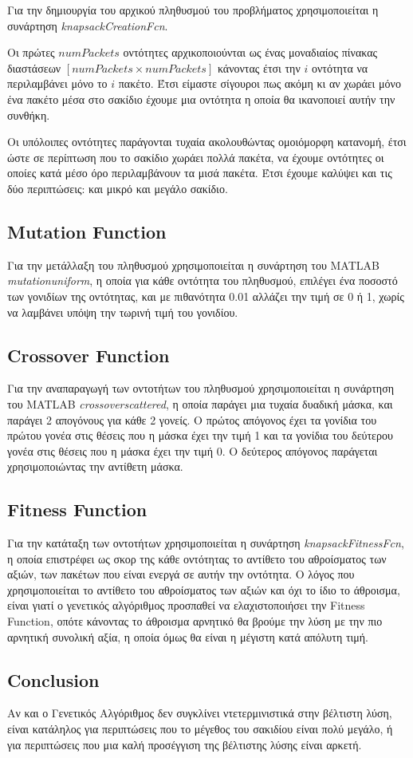 \documentclass{article}
\begin{document}
Για την δημιουργία του αρχικού πληθυσμού του προβλήματος χρησιμοποιείται η
συνάρτηση \textit{knapsackCreationFcn}.

Οι πρώτες $\textit{numPackets}$ οντότητες αρχικοποιούνται ως ένας μοναδιαίος
πίνακας διαστάσεων $\left[\textit{numPackets} \times \textit{numPackets}\right]$
κάνοντας έτσι την $i$ οντότητα να περιλαμβάνει μόνο το $i$ πακέτο. Έτσι είμαστε
σίγουροι πως ακόμη κι αν χωράει μόνο ένα πακέτο μέσα στο σακίδιο έχουμε μια
οντότητα η οποία θα ικανοποιεί αυτήν την συνθήκη.

Οι υπόλοιπες οντότητες παράγονται τυχαία ακολουθώντας ομοιόμορφη κατανομή, έτσι
ώστε σε περίπτωση που το σακίδιο χωράει πολλά πακέτα, να έχουμε οντότητες οι
οποίες κατά μέσο όρο περιλαμβάνουν τα μισά πακέτα. Έτσι έχουμε καλύψει και τις
δύο περιπτώσεις: και μικρό και μεγάλο σακίδιο.

\subsection{Mutation Function}

\begin{sloppypar}
Για την μετάλλαξη του πληθυσμού χρησιμοποιείται η συνάρτηση του MATLAB
\textit{mutationuniform}, η οποία για κάθε οντότητα του πληθυσμού, επιλέγει ένα
ποσοστό των γονιδίων της οντότητας, και με πιθανότητα 0.01 αλλάζει την τιμή σε 0
ή 1, χωρίς να λαμβάνει υπόψη την τωρινή τιμή του γονιδίου.
\end{sloppypar}

\subsection{Crossover Function}

Για την αναπαραγωγή των οντοτήτων του πληθυσμού χρησιμοποιείται η συνάρτηση του
MATLAB \textit{crossoverscattered}, η οποία παράγει μια τυχαία δυαδική μάσκα,
και παράγει 2 απογόνους για κάθε 2 γονείς. Ο πρώτος απόγονος έχει τα γονίδια του
πρώτου γονέα στις θέσεις που η μάσκα έχει την τιμή 1 και τα γονίδια του δεύτερου
γονέα στις θέσεις που η μάσκα έχει την τιμή 0. Ο δεύτερος απόγονος παράγεται
χρησιμοποιώντας την αντίθετη μάσκα.

\subsection{Fitness Function}

Για την κατάταξη των οντοτήτων χρησιμοποιείται η συνάρτηση
\textit{knapsackFitnessFcn}, η οποία επιστρέφει ως σκορ της κάθε οντότητας το
αντίθετο του αθροίσματος των αξιών, των πακέτων που είναι ενεργά σε αυτήν την
οντότητα. Ο λόγος που χρησιμοποιείται το αντίθετο του αθροίσματος των αξιών και
όχι το ίδιο το άθροισμα, είναι γιατί ο γενετικός αλγόριθμος προσπαθεί να
ελαχιστοποιήσει την Fitness Function, οπότε κάνοντας το άθροισμα αρνητικό θα
βρούμε την λύση με την πιο αρνητική συνολική αξία, η οποία όμως θα είναι η
μέγιστη κατά απόλυτη τιμή.

\subsection{Conclusion}

Αν και ο Γενετικός Αλγόριθμος δεν συγκλίνει ντετερμινιστικά στην βέλτιστη λύση,
είναι κατάληλος για περιπτώσεις που το μέγεθος του σακιδίου είναι πολύ μεγάλο, ή
για περιπτώσεις που μια καλή προσέγγιση της βέλτιστης λύσης είναι αρκετή.
\end{document}
